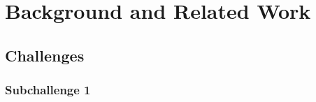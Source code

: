 \chapter{Background and Related Work} \label{ch-2}

\section{Challenges}
\subsection{Subchallenge 1}

